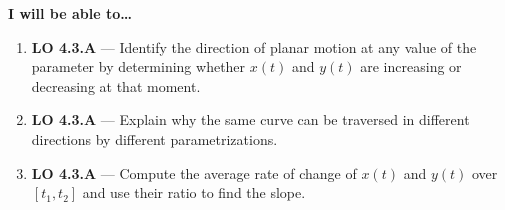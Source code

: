 \documentclass[10pt]{article}
\begin{document}
\namedateperiod

\vspace{0.10in}

\begin{objectivebox}
\textbf{I will be able to\ldots}
\begin{enumerate}[leftmargin=1.5em, itemsep=4pt]
  \item \textbf{LO 4.3.A} --- Identify the direction of planar motion
    at any value of the parameter by determining whether $x(t)$ and
    $y(t)$ are increasing or decreasing at that moment.
  \item \textbf{LO 4.3.A} --- Explain why the same curve can be traversed
    in different directions by different parametrizations.
  \item \textbf{LO 4.3.A} --- Compute the average rate of change of $x(t)$
    and $y(t)$ over $[t_1, t_2]$ and use their ratio to find the slope.
\end{enumerate}
\end{objectivebox}

\vspace{0.08in}
\end{document}
